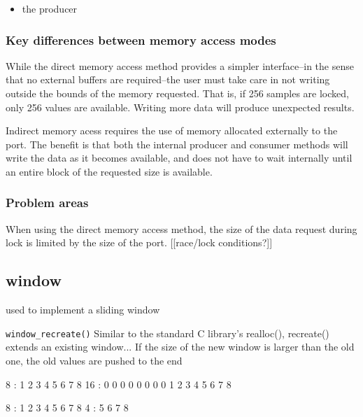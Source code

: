 \begin{itemize}
\item the producer 
\end{itemize}



\subsubsection{Key differences between memory access modes}
While the direct memory access method provides a simpler interface--in the
sense that no external buffers are required--the user must take care in not
writing outside the bounds of the memory requested.
That is, if 256 samples are locked, only 256 values are available.
Writing more data will produce unexpected results.

Indirect memory acess requires the use of memory allocated externally to the
port.
The benefit is that both the internal producer and consumer methods will write
the data as it becomes available, and does not have to wait internally until
an entire block of the requested size is available.

\subsubsection{Problem areas}
When using the direct memory access method, the size of the data request
during lock is limited by the size of the port.
[[race/lock conditions?]]

\subsection{window}
used to implement a sliding window

{\tt window\_recreate()}
Similar to the standard C library's realloc(), recreate() extends an existing
window...
If the size of the new window is larger than the old one, the old values are
pushed to the end

8   : 1 2 3 4 5 6 7 8
16  : 0 0 0 0 0 0 0 0 1 2 3 4 5 6 7 8

8   : 1 2 3 4 5 6 7 8
4   : 5 6 7 8
